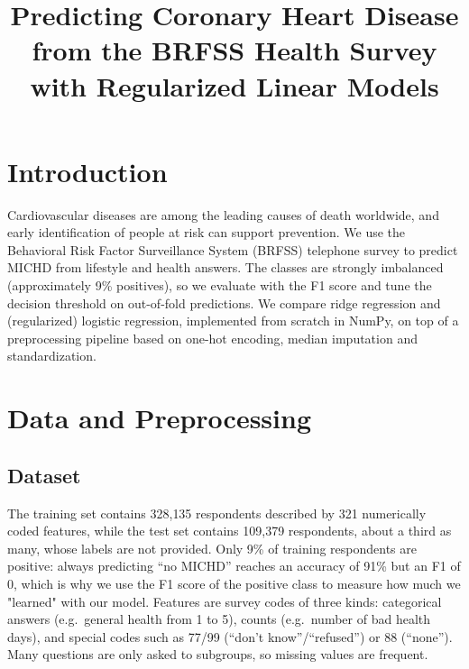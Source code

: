 \documentclass[10pt,conference]{IEEEtran}
\begin{document}
\title{Predicting Coronary Heart Disease from the BRFSS Health Survey\\
with Regularized Linear Models}

\author{
}

\maketitle

\section{Introduction}
Cardiovascular diseases are among the leading causes of death worldwide, and
early identification of people at risk can support prevention. We use the
Behavioral Risk Factor Surveillance System (BRFSS) telephone survey
to predict MICHD from lifestyle and health answers. The classes are
strongly imbalanced (approximately 9\% positives), so we evaluate with the F1 score and tune the decision threshold on out-of-fold predictions. We compare ridge
regression and (regularized) logistic regression, implemented from scratch in
NumPy, on top of a preprocessing pipeline based on one-hot encoding, median imputation and standardization.

\section{Data and Preprocessing}

\subsection{Dataset}
The training set contains 328{,}135 respondents described by 321 numerically coded features, while the test set contains 109{,}379 respondents, about a third as many, whose labels are not provided. Only 9\% of training respondents are positive:
always predicting ``no MICHD'' reaches an accuracy of 91\% but an F1 of
0, which is why we use the F1 score of the positive class to measure how much we "learned" with our model.
Features are survey codes of three kinds: categorical answers (e.g.\ general
health from 1 to 5), counts (e.g.\ number of bad health days), and special
codes such as 77/99 (``don't know''/``refused'') or 88 (``none''). Many questions are only asked to subgroups, so missing values
are frequent.
\end{document}
